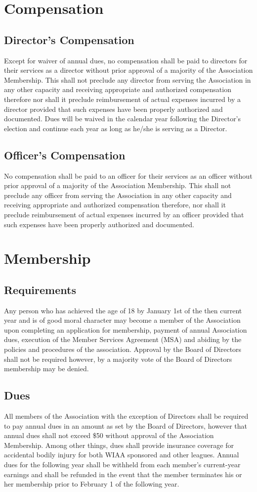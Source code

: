 \documentclass[letterpaper,11pt]{article}
\begin{document}
\section{Compensation}
\subsection{Director's Compensation}
Except for waiver of annual dues, no compensation shall be paid to directors for their services as a director without prior approval of a majority of the Association Membership. This shall not preclude any director from serving the Association in any other capacity and receiving appropriate and authorized compensation therefore nor shall it preclude reimbursement of actual expenses incurred by a director provided that such expenses have been properly authorized and documented. Dues will be waived in the calendar year following the Director’s election and continue each year as long as he/she is serving as a Director.
\subsection{Officer's Compensation}
No compensation shall be paid to an officer for their services as an officer without prior approval of a majority of the Association Membership. This shall not preclude any officer from serving the Association in any other capacity and receiving appropriate and authorized compensation therefore, nor shall it preclude reimbursement of actual expenses incurred by an officer provided that such expenses have been properly authorized and documented.
\section{Membership}
\subsection{Requirements}
Any person who has achieved the age of 18 by January 1st of the then current year and is of good moral character may become a member of the Association upon completing an application for membership, payment of annual Association dues, execution of the Member Services Agreement (MSA) and abiding by the policies and procedures of the association. Approval by the Board of Directors shall not be required however, by a majority vote of the Board of Directors membership may be denied.
\subsection{Dues}
All members of the Association with the exception of Directors shall be required to pay annual dues in an amount as set by the Board of Directors, however that annual dues shall not exceed \$50 without approval of the Association Membership. Among other things, dues shall provide insurance coverage for accidental bodily injury for both WIAA sponsored and other leagues. Annual dues for the following year shall be withheld from each member's current-year earnings and shall be refunded in the event that the member terminates his or her membership prior to February 1 of the following year.
\end{document}
